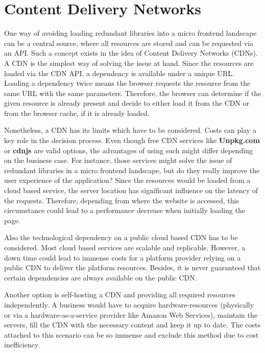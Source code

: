 \section{Content Delivery Networks}
\label{cdn_intro}

One way of avoiding loading redundant libraries into a micro frontend landscape can be a central source, where all resources are stored and can be requested via an API. Such a concept exists in the idea of Content Delivery Networks (CDNs).
A CDN is the simplest way of solving the issue at hand. Since the resources are loaded via the CDN API, a dependency is available under a unique URL. Loading a dependency twice means the browser requests the resource from the same URL with the same parameters. Therefore, the browser can determine if the given resource is already present and decide to either load it from the CDN or from the browser cache, if it is already loaded.\cite{caching_in_browser}

Nonetheless, a CDN has its limits which have to be considered. Costs can play a key role in the decision process.
Even though free CDN services like \textbf{Unpkg.com} or \textbf{cdnjs} are valid options, the advantages of using such might differ depending on the business case.
For instance, those services might solve the issue of redundant libraries in a micro frontend landscape, but do they really improve the user experience of the application? 
Since the resources would be loaded from a cloud based service, the server location has significant influence on the latency of the requests. Therefore, depending from where the website is accessed, this circumstance could lead to a performance decrease when initially loading the page.\cite{cdn_general}

Also the technological dependency on a public cloud based CDN has to be considered. Most cloud based services are scalable and replicable. However, a down time could lead to immense costs for a platform provider relying on a public CDN to deliver the platform resources.
Besides, it is never guaranteed that certain dependencies are always available on the public CDN.

Another option is self-hosting a CDN and providing all required resources independently. A business would have to acquire hardware-resources (physically or via a hardware-as-a-service provider like Amazon Web Services), maintain the servers, fill the CDN with the necessary content and keep it up to date. The costs attached to this scenario can be so immense and exclude this method due to cost inefficiency.\cite{Meassuring_a_commercial_CDN}

